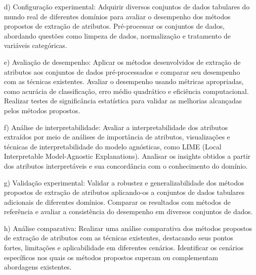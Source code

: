\documentclass{article}
\begin{document}
d) Configuração experimental: Adquirir diversos conjuntos de dados tabulares do mundo real de diferentes domínios para avaliar o desempenho dos métodos propostos de extração de atributos. Pré-processar os conjuntos de dados, abordando questões como limpeza de dados, normalização e tratamento de variáveis categóricas.

e) Avaliação de desempenho: Aplicar os métodos desenvolvidos de extração de atributos aos conjuntos de dados pré-processados e comparar seu desempenho com as técnicas existentes. Avaliar o desempenho usando métricas apropriadas, como acurácia de classificação, erro médio quadrático e eficiência computacional. Realizar testes de significância estatística para validar as melhorias alcançadas pelos métodos propostos.

f) Análise de interpretabilidade: Avaliar a interpretabilidade dos atributos extraídos por meio de análises de importância de atributos, visualizações e técnicas de interpretabilidade do modelo agnósticas, como LIME (Local Interpretable Model-Agnostic Explanations). Analisar os insights obtidos a partir dos atributos interpretáveis e sua concordância com o conhecimento do domínio.

g) Validação experimental: Validar a robustez e generalizabilidade dos métodos propostos de extração de atributos aplicando-os a conjuntos de dados tabulares adicionais de diferentes domínios. Comparar os resultados com métodos de referência e avaliar a consistência do desempenho em diversos conjuntos de dados.

h) Análise comparativa: Realizar uma análise comparativa dos métodos propostos de extração de atributos com as técnicas existentes, destacando seus pontos fortes, limitações e aplicabilidade em diferentes cenários. Identificar os cenários específicos nos quais os métodos propostos superam ou complementam abordagens existentes. 

   
 



\end{document}
